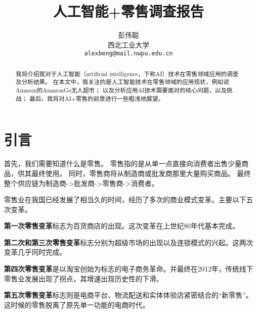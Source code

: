 \documentclass[10pt,twocolumn,letterpaper]{article}
\begin{document}
\title{人工智能+零售调查报告}

\author{彭伟聪\\
西北工业大学\\
{\tt\small alexbeng@mail.nwpu.edu.cn}
}

\maketitle

\begin{abstract}
   我将介绍我对于人工智能（artificial intelligence，下称AI）技术在零售领域应用的调查及分析结果。
   在本文中，我关注的是人工智能技术在零售领域的应用现状，例如说Amazon的AmazonGo无人超市；
   以及分析应用AI技术需要面对的核心问题，以及挑战；
   最后，我将对AI+零售的前景进行一些粗浅地展望。
\end{abstract}

\section{引言}

首先，我们需要知道什么是零售。
零售指的是从单一点直接向消费者出售少量商品，供其最终使用。
同时，零售商将从制造商或批发商那里大量购买商品。
最终整个供应链为制造商->批发商->零售商->消费者。

零售业在我国已经发展了相当久的时间，经历了多次的商业模式变革\cite{徐印州2017新零售的产生与演进}。主要以下五次变革。

\textbf{第一次零售变革}标志为百货商店的出现。这次变革在上世纪80年代基本完成。

\textbf{第二次和第三次零售变革}标志分别为超级市场的出现以及连锁模式的兴起。这两次变革几乎同时完成。

\textbf{第四次零售变革}是以淘宝创始为标志的电子商务革命。并最终在2012年，传统线下零售业发展出现了拐点，其增速出现历史性的下滑。

\textbf{第五次零售变革}标志则是电商平台、物流配送和实体体验店紧密结合的“新零售”。这时候的零售脱离了原先单一功能的电商时代。
\end{document}
